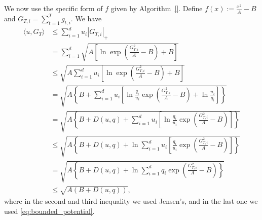 We now use the specific form of $f$ given by Algorithm~\ref{}.
Define $f(x):= \frac{x^2}{A} - B$ and $G_{T,i}=\sum_{t=1}^T g_{t,i}$.
We have
\begin{align*}
\langle u, G_T \rangle 
&\leq \sum_{i=1}^d u_i |G_{T,i}|_+ \\
&= \sum_{i=1}^d \sqrt{A \left[\ln \exp\left(\frac{G_{T,i}^2}{A}-B\right)+B \right]} \\
&\leq  \sqrt{A \sum_{i=1}^d u_i \left[\ln \exp\left(\frac{G_{T,i}^2}{A}-B\right)+B \right]} \\
&=  \sqrt{A \left\{B+\sum_{i=1}^d u_i \left[\ln \frac{q_i}{u_i}\exp\left(\frac{G_{T,i}^2}{A}-B\right) + \ln \frac{u_i}{q_i}\right]\right\}} \\
&=  \sqrt{A \left\{B+D(u,q)+\sum_{i=1}^d u_i \left[\ln \frac{q_i}{u_i}\exp\left(\frac{G_{T,i}^2}{A}-B\right)\right]\right\}} \\
&\leq  \sqrt{A \left\{B+D(u,q)+ \ln \sum_{i=1}^d u_i \left[ \frac{q_i}{u_i}\exp\left(\frac{G_{T,i}^2}{A}-B\right)\right]\right\}} \\
&=  \sqrt{A \left\{B+D(u,q)+ \ln \sum_{i=1}^d q_i\exp\left(\frac{G_{T,i}^2}{A}-B\right)\right\}} \\
&\leq  \sqrt{A \left(B+D(u,q)\right)},
\end{align*}
where in the second and third inequality we used Jensen's, and in the last one we used \eqref{eq:bounded_potential}.